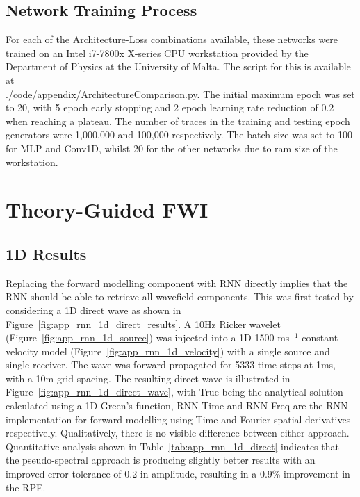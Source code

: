 \subsection{Network Training Process}
For each of the Architecture-Loss combinations available, these networks were trained on an Intel i7-7800x X-series CPU workstation provided by the Department of Physics at the University of Malta. The script for this is available at \\
\href{https://gitfront.io/r/zerafachris/52df30fb666ba880749c8e951a3d056ce628a6cd/PhD/blob/code/appendix/ArchitectureComparison.py}{\url{./code/appendix/ArchitectureComparison.py}}. The initial maximum epoch was set to 20, with 5 epoch early stopping and 2 epoch learning rate reduction of 0.2 when reaching a plateau. The number of traces in the training and testing epoch generators were 1,000,000 and 100,000 respectively. The batch size was set to 100 for MLP and Conv1D, whilst 20 for the other networks due to ram size of the workstation.

\clearpage
\section[Theory-Guided FWI]{Theory-Guided FWI}
\subsection{1D Results}\label{sec:app_results_rnn_fwi_1d}
Replacing the forward modelling component with RNN directly implies that the RNN should be able to retrieve all wavefield components. This was first tested by considering a 1D direct wave as shown in Figure~\ref{fig:app_rnn_1d_direct_results}. A 10Hz Ricker wavelet (Figure~\ref{fig:app_rnn_1d_source}) was injected into a 1D 1500 ms$^{-1}$ constant velocity model (Figure~\ref{fig:app_rnn_1d_velocity}) with a single source and single receiver. The wave was forward propagated for 5333 time-steps at 1ms, with a 10m grid spacing. The resulting direct wave is illustrated in Figure~\ref{fig:app_rnn_1d_direct_wave}, with True being the analytical solution calculated using a 1D Green’s function, RNN Time and RNN Freq are the RNN implementation for forward modelling using Time and Fourier spatial derivatives respectively. Qualitatively, there is no visible difference between either approach. Quantitative analysis shown in Table~\ref{tab:app_rnn_1d_direct} indicates that the pseudo-spectral approach is producing slightly better results with an improved error tolerance of 0.2 in amplitude, resulting in a 0.9\% improvement in the \ac{RPE}.

